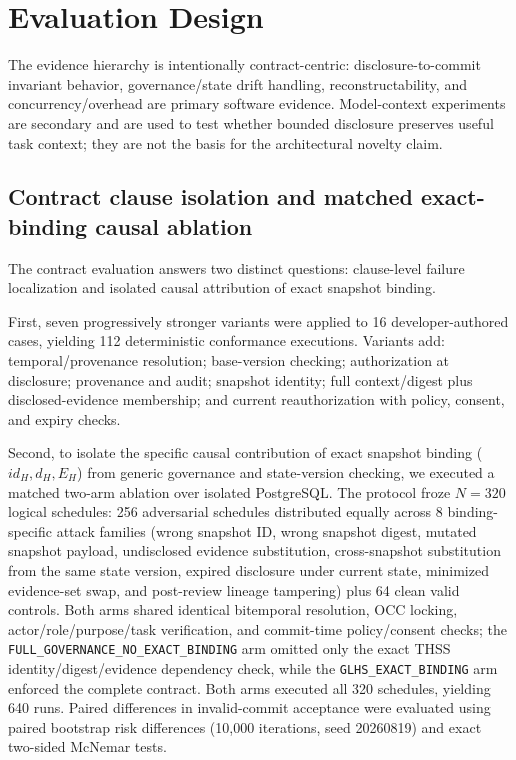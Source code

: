 \documentclass[11pt]{article}
\begin{document}
\section{Evaluation Design}
The evidence hierarchy is intentionally contract-centric: disclosure-to-commit invariant behavior, governance/state drift handling, reconstructability, and concurrency/overhead are primary software evidence. Model-context experiments are secondary and are used to test whether bounded disclosure preserves useful task context; they are not the basis for the architectural novelty claim.

\subsection{Contract clause isolation and matched exact-binding causal ablation}
The contract evaluation answers two distinct questions: clause-level failure localization and isolated causal attribution of exact snapshot binding.

First, seven progressively stronger variants were applied to 16 developer-authored cases, yielding 112 deterministic conformance executions. Variants add: temporal/provenance resolution; base-version checking; authorization at disclosure; provenance and audit; snapshot identity; full context/digest plus disclosed-evidence membership; and current reauthorization with policy, consent, and expiry checks.

Second, to isolate the specific causal contribution of exact snapshot binding ($id_H, d_H, E_H$) from generic governance and state-version checking, we executed a matched two-arm ablation over isolated PostgreSQL. The protocol froze $N=320$ logical schedules: 256 adversarial schedules distributed equally across 8 binding-specific attack families (wrong snapshot ID, wrong snapshot digest, mutated snapshot payload, undisclosed evidence substitution, cross-snapshot substitution from the same state version, expired disclosure under current state, minimized evidence-set swap, and post-review lineage tampering) plus 64 clean valid controls. Both arms shared identical bitemporal resolution, OCC locking, actor/role/purpose/task verification, and commit-time policy/consent checks; the \texttt{FULL\_GOVERNANCE\_NO\_EXACT\_BINDING} arm omitted only the exact THSS identity/digest/evidence dependency check, while the \texttt{GLHS\_EXACT\_BINDING} arm enforced the complete contract. Both arms executed all 320 schedules, yielding 640 runs. Paired differences in invalid-commit acceptance were evaluated using paired bootstrap risk differences (10,000 iterations, seed 20260819) and exact two-sided McNemar tests.
\end{document}
